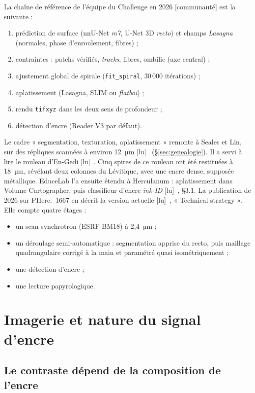 \documentclass[11pt,a4paper]{article}
\newcommand{\lu}{\textsf{\small[lu]}}
\newcommand{\commu}{\textsf{\small[communauté]}}
\newcommand{\pherc}[1]{PHerc.~#1}
\begin{document}
La chaîne de référence de l'équipe du Challenge en 2026 \commu{} est la suivante :
\begin{enumerate}
  \item prédiction de surface (nnU-Net \emph{m7}, U-Net 3D \emph{recto}) et champs
  \emph{Lasagna} (normales, phase d'enroulement, fibres) ;
  \item contraintes : patchs vérifiés, \emph{tracks}, fibres, ombilic (axe central) ;
  \item ajustement global de spirale (\texttt{fit\_spiral}, 30\,000 itérations) ;
  \item aplatissement (Lasagna, SLIM ou \emph{flatboi}) ;
  \item rendu \texttt{tifxyz} dans les deux sens de profondeur ;
  \item détection d'encre (Reader V3 par défaut).
\end{enumerate}
Le cadre « segmentation, texturation, aplatissement » remonte à Seales et Lin, sur des
répliques scannées à environ 12~µm \lu~\cite{seales2004,lin2005} (§\ref{sec:genealogie}). Il a
servi à lire le rouleau d'En-Gedi \lu~\cite{seales2016}. Cinq spires de ce rouleau ont été restituées à 18~µm,
révélant deux colonnes du Lévitique, avec une encre dense, supposée métallique. EduceLab l'a
ensuite étendu à Herculanum : aplatissement dans Volume Cartographer, puis classifieur d'encre
\emph{ink-ID} \lu~\cite{parsons2023}, §3.1. La
publication de 2026 sur \pherc{1667} en décrit la version actuelle
\lu~\cite{angelotti2026complete}, « Technical strategy ». Elle compte quatre étages :
\begin{itemize}
  \item un scan synchrotron (ESRF BM18) à 2,4~µm ;
  \item un déroulage semi-automatique : segmentation apprise du recto, puis maillage quadrangulaire
  corrigé à la main et paramétré quasi isométriquement ;
  \item une détection d'encre ;
  \item une lecture papyrologique.
\end{itemize}

\section{Imagerie et nature du signal d'encre}

\subsection{Le contraste dépend de la composition de l'encre}
\end{document}
